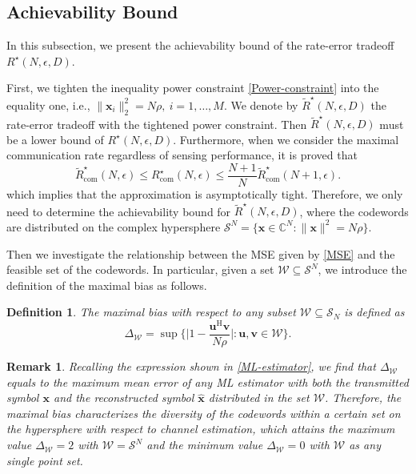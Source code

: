 \documentclass[conference,a4paper]{IEEEtran}
\newcommand{\V}[1]{\bm{#1}} %
\newtheorem{remark}{Remark}
\newtheorem{definition}{Definition}
\begin{document}
\subsection{Achievability Bound}
In this subsection, we present the achievability bound of the rate-error tradeoff $R^\star(N,\epsilon,D)$. 

First, we tighten the inequality power constraint \eqref{Power-constraint} into the equality one, i.e.,  $\|\V{x}_i\|_2^2 = N\rho, \ i=1,\ldots,M$. We denote by $\tilde{R}^\star(N,\epsilon,D)$ the rate-error tradeoff with the tightened power constraint. Then $\tilde{R}^\star(N,\epsilon,D)$ must be a lower bound of $R^\star(N,\epsilon,D)$. Furthermore, when we consider the maximal communication rate regardless of sensing performance, it is proved that\cite{PolPooVer:J10}
\begin{equation}
    \tilde{R}_\mathrm{com}^\star(N,\epsilon) \leq R_\mathrm{com}^\star(N,\epsilon)\leq \frac{N+1}{N}\tilde{R}_\mathrm{com}^\star(N+1,\epsilon).
\end{equation}
which implies that the approximation is asymptotically tight. Therefore, we only need to determine the achievability bound for $\tilde{R}^\star(N,\epsilon,D)$, where the codewords are distributed on the complex hypersphere $\mathcal{S}^N = \{\V{x}\in\mathbb{C}^N:\|\V{x}\|^2 = N\rho\}$.

Then we investigate the relationship between the MSE given by \eqref{MSE} and the feasible set of the codewords. In particular, given a set $\mathcal{W}\subseteq \mathcal{S}^N$, we introduce the definition of the maximal bias as follows.
\begin{definition}
    The maximal bias with respect to any subset $\mathcal{W}\subseteq \mathcal{S}_N$ is defined as
    \begin{equation}
    \Delta_{\mathcal{W}} = \sup \bigg\{\bigg|1-\frac{\V{u}^\mathrm{H}\V{v}}{N\rho}\bigg|: \V{u},\V{v}\in \mathcal{W}\bigg\}.
    \end{equation}
\end{definition}


\begin{remark}
Recalling the expression shown in \eqref{ML-estimator}, we find that $\Delta_{\mathcal{W}}$ equals to the maximum mean error of any ML estimator with both the transmitted symbol $\mathbf{x}$ and the reconstructed symbol $\hat{\mathbf{x}}$ distributed in the set $\mathcal{W}$. Therefore, the maximal bias characterizes the diversity of the codewords within a certain set on the hypersphere with respect to channel estimation, which attains the maximum value $\Delta_{\mathcal{W}} = 2$ with $\mathcal{W} = \mathcal{S}^N$ and the minimum value $\Delta_{\mathcal{W}} = 0$ with $\mathcal{W}$ as any single point set.
\end{remark}
\end{document}

